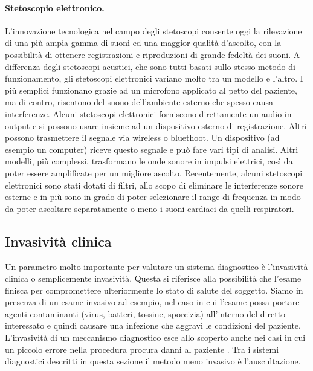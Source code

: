 \paragraph{Stetoscopio elettronico.}
    L'innovazione tecnologica nel campo degli stetoscopi consente oggi la rilevazione di una pi\`u ampia gamma di suoni ed una maggior qualit\`a d'ascolto, con la possibilit\`a di ottenere registrazioni e riproduzioni di grande fedelt\`a dei suoni. 
    A differenza degli stetoscopi acustici, che sono tutti basati sullo stesso metodo di funzionamento, gli stetoscopi elettronici variano molto tra un modello e l'altro. 
    I pi\`u semplici funzionano grazie ad un microfono applicato al petto del paziente, ma di contro, risentono del suono dell'ambiente esterno che spesso causa interferenze. 
    Alcuni stetoscopi elettronici forniscono direttamente un audio in output e si possono usare insieme ad un dispositivo esterno di registrazione. 
    Altri possono trasmettere il segnale via wireless o bluethoot. Un dispositivo (ad esempio un computer) riceve questo segnale e pu\`o fare vari tipi di analisi. 
    Altri modelli, pi\`u complessi, trasformano le onde sonore in impulsi elettrici, cos\`i da poter essere amplificate per un migliore ascolto. 
    Recentemente, alcuni stetoscopi elettronici sono stati dotati di filtri, allo scopo di eliminare le interferenze sonore esterne e in pi\`u sono in grado di poter selezionare il range di frequenza in modo da poter ascoltare separatamente o meno i suoni cardiaci da quelli respiratori. \cite{fusello}


\subsection{Invasivit\`a clinica}

Un parametro molto importante per valutare un sistema diagnostico \`e l'invasivit\`a clinica o semplicemente invasivit\`a. 
Questa si riferisce alla possibilit\`a che l'esame finisca per compromettere ulteriormente lo stato di salute del soggetto. 
Siamo in presenza di un esame invasivo ad esempio, nel caso in cui l'esame possa portare agenti contaminanti (virus, batteri, tossine, sporcizia) all'interno del diretto interessato e quindi causare una infezione che aggravi le condizioni del paziente. 
L'invasivit\`a di un meccanismo diagnostico esce allo scoperto anche nei casi in cui un piccolo errore nella procedura procura danni al paziente \cite{Invasivita}.
Tra i sistemi diagnostici descritti in questa sezione il metodo meno invasivo \`e l'auscultazione.


